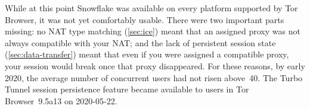 \documentclass[letterpaper,twocolumn]{article}
\begin{document}
While at this point Snowflake was available
on every platform supported by Tor Browser,
it was not yet comfortably usable.
There were two important parts missing:
no NAT type matching (\autoref{sec:ice})
meant that an assigned proxy was not always compatible with your NAT;
and the lack of persistent session state (\autoref{sec:data-transfer})
meant that even if you were assigned a compatible proxy,
your session would break once that proxy disappeared.
For these reasons, by early 2020,
the average number of concurrent users
had not risen above~40.
%
%
The Turbo Tunnel session persistence feature
became available to users in Tor Browser~9.5a13
on \mbox{2020-05-22}.
\end{document}
